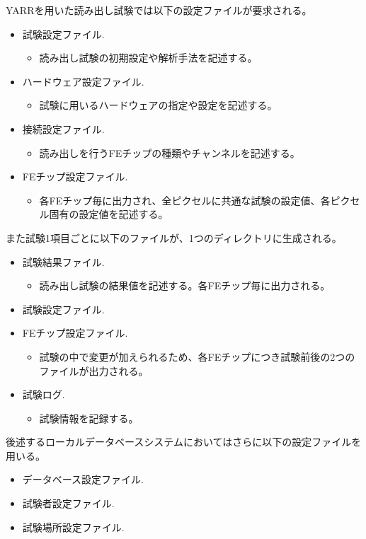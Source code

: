 YARRを用いた読み出し試験では以下の設定ファイルが要求される。
\begin{itemize}
  \item 試験設定ファイル.
  \begin{itemize}
    \item 読み出し試験の初期設定や解析手法を記述する。
  \end{itemize}
  \item ハードウェア設定ファイル.
  \begin{itemize}
    \item 試験に用いるハードウェアの指定や設定を記述する。
  \end{itemize}
  \item 接続設定ファイル.
  \begin{itemize}
    \item 読み出しを行うFEチップの種類やチャンネルを記述する。
  \end{itemize}  
  \item FEチップ設定ファイル.
  \begin{itemize}
    \item 各FEチップ毎に出力され、全ピクセルに共通な試験の設定値、各ピクセル固有の設定値を記述する。
  \end{itemize}  
\end{itemize}

また試験1項目ごとに以下のファイルが、1つのディレクトリに生成される。
\begin{itemize}
  \item 試験結果ファイル.
  \begin{itemize}
    \item 読み出し試験の結果値を記述する。各FEチップ毎に出力される。
  \end{itemize}
  \item 試験設定ファイル.
  \item FEチップ設定ファイル.
  \begin{itemize}
    \item 試験の中で変更が加えられるため、各FEチップにつき試験前後の2つのファイルが出力される。
  \end{itemize}
  \item 試験ログ.
  \begin{itemize}
    \item 試験情報を記録する。
  \end{itemize}
\end{itemize}

後述するローカルデータベースシステムにおいてはさらに以下の設定ファイルを用いる。
\begin{itemize}
  \item データベース設定ファイル.
  \item 試験者設定ファイル. 
  \item 試験場所設定ファイル.
\end{itemize}

